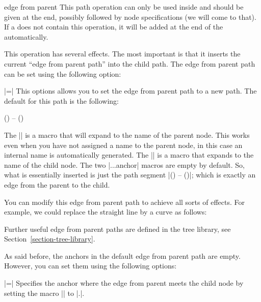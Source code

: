 \begin{pathoperation}{edge from parent}{}
  This path operation can only be used inside  and
  should be given at the end, possibly followed by node specifications
  (we will come to that). If a  does not contain this
  operation, it will be added at the end of the 
  automatically.

  This operation has several effects. The most important is that it
  inserts the current ``edge from parent path'' into the child
  path. The edge from parent path can be set using the following
  option:
  \begin{itemize}
    |=|
    This options allows you to set the edge from parent path to a new
    path. The default for this path is the following:
    \begin{codeexample}
(\tikzparentnode\tikzparentanchor) -- (\tikzchildnode\tikzchildanchor)      
    \end{codeexample}
    The |\tikzparentnode| is a macro that will expand to the name of
    the parent node. This works even when you have not assigned a name
    to the parent node, in this case an internal name is automatically
    generated. The |\tikzchildnode| is a macro that expands to the
    name of the child node. The two |...anchor| macros are empty by
    default. So, what is essentially inserted is just the path segment
    |(\tikzparentnode) -- (\tikzchildnode)|; which is exactly an edge
    from the parent to the child.

    You can modify this edge from parent path to achieve all sorts of
    effects. For example, we could replace the straight line by a
    curve as follows:
\begin{codeexample}[]
\end{codeexample}

    Further useful edge from parent paths are defined in the tree
    library, see Section~\ref{section-tree-library}.

    As said before, the anchors in the default edge from parent path
    are empty. However, you can set them using the following options:
    \begin{itemize}
      |=|
      Specifies the anchor where the edge from parent meets the child
      node by setting the macro |\tikzchildanchor| to
      |.|.


\end{itemize}
\end{itemize}
\end{pathoperation}
